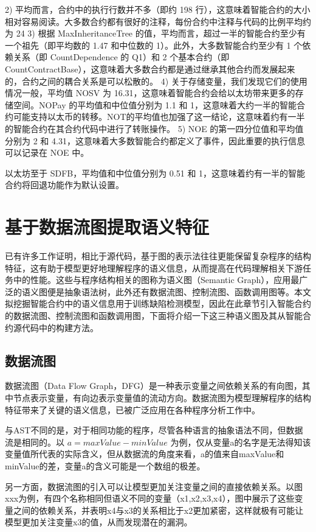 2) 平均而言，合约中的执行行数并不多（即约 198 行），这意味着智能合约的大小相对容易阅读。大多数合约都有很好的注释，每份合约中注释与代码的比例平均约为 24%
3) 根据 MaxInheritanceTree 的值，平均而言，超过一半的智能合约至少有一个祖先（即平均数的 1.47 和中位数的 1）。此外，大多数智能合约至少有 1 个依赖关系（即 CountDependence 的 Q1）和 2 个基本合约（即 CountContractBase），这意味着大多数合约都是通过继承其他合约而发展起来的，合约之间的耦合关系是可以松散的。
4) 关于存储变量，我们发现它们的使用情况一般，平均值 NOSV 为 16.31，这意味着智能合约会给以太坊带来更多的存储空间。NOPay 的平均值和中位值分别为 1.1 和 1，这意味着大约一半的智能合约可能支持以太币的转移。NOT的平均值也加强了这一结论，这意味着约有一半的智能合约在其合约代码中进行了转账操作。
5) NOE 的第一四分位值和平均值分别为 2 和 4.31，这意味着大多数智能合约都定义了事件，因此重要的执行信息可以记录在 NOE 中。


以太坊至于 SDFB，平均值和中位值分别为 0.51 和 1，这意味着约有一半的智能合约将回退功能作为默认设置。
\section{基于数据流图提取语义特征}

已有许多工作证明，相比于源代码，基于图的表示法往往更能保留复杂程序的结构特征\cite{allamanis2017learning}，这有助于模型更好地理解程序的语义信息，从而提高在代码理解相关下游任务中的性能。这些与程序结构相关的图称为语义图（Semantic Graph），应用最广泛的语义图便是抽象语法树，此外还有数据流图、控制流图、函数调用图等。本文拟挖掘智能合约中的语义信息用于训练缺陷检测模型，因此在此章节引入智能合约的数据流图、控制流图和函数调用图，下面将介绍一下这三种语义图及其从智能合约源代码中的构建方法。

\subsection{数据流图}
数据流图（Data Flow Graph，DFG）是一种表示变量之间依赖关系的有向图，其中节点表示变量，有向边表示变量值的流动方向。数据流图为模型理解程序的结构特征带来了关键的语义信息，已被广泛应用在各种程序分析工作中\cite{hellendoorn2019global,allamanis2018learning,guo2020graphcodebert}。

与AST不同的是，对于相同功能的程序，尽管各种语言的抽象语法不同，但数据流是相同的。以 $a=maxValue-minValue$ 为例，仅从变量a的名字是无法得知该变量值所代表的实际含义，但从数据流的角度来看，a的值来自maxValue和minValue的差，变量a的含义可能是一个数组的极差。

另一方面，数据流图的引入可以让模型更加关注变量之间的直接依赖关系。以图xxx为例，有四个名称相同但语义不同的变量（x1,x2,x3,x4），图中展示了这些变量之间的依赖关系，并表明x4与x3的关系相比于x2更加紧密，这样就极有可能让模型更加关注变量x3的值，从而发现潜在的漏洞。

